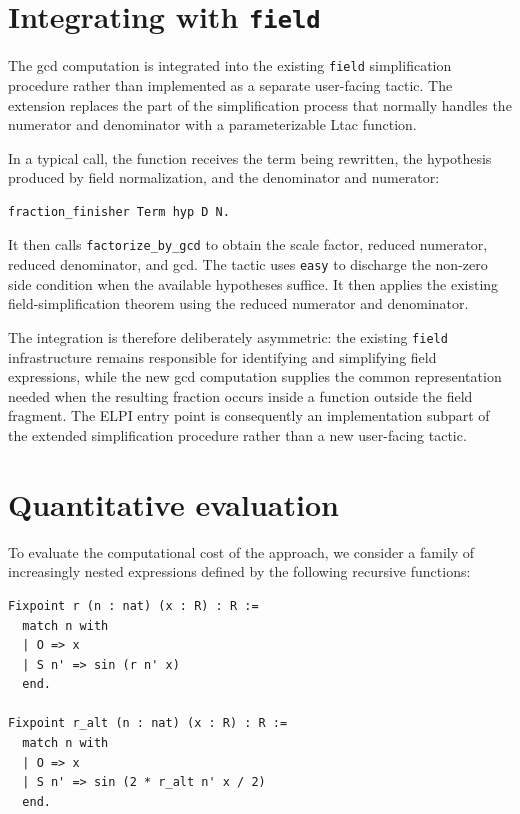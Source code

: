 \documentclass[11pt]{article}
\begin{document}
\section{Integrating with \texttt{field}}


The gcd computation is integrated into the existing \texttt{field}
simplification procedure rather than implemented as a separate user-facing
tactic. The extension replaces the part of the simplification process that
normally handles the numerator and denominator with a parameterizable Ltac
function. 

In a typical call, the function receives the term being rewritten, the
hypothesis produced by field normalization, and the denominator and numerator:
\begin{lstlisting}[language=ML]
fraction_finisher Term hyp D N.
\end{lstlisting}

It then calls \texttt{factorize\_by\_gcd} to obtain the scale factor, reduced
numerator, reduced denominator, and gcd. The tactic uses \texttt{easy} to discharge the non-zero side condition when the available hypotheses suffice. It then applies the existing field-simplification theorem using the reduced numerator and denominator.


The integration is therefore deliberately asymmetric: the existing
\texttt{field} infrastructure remains responsible for identifying and
simplifying field expressions, while the new gcd computation supplies the
common representation needed when the resulting fraction occurs inside a
function outside the field fragment. The ELPI entry point is consequently an
implementation subpart of the extended simplification procedure rather than a
new user-facing tactic.

\section{Quantitative evaluation}

To evaluate the computational cost of the approach, we consider a
family of increasingly nested expressions defined by the following
recursive functions:

\begin{lstlisting}[language=Rocq]
Fixpoint r (n : nat) (x : R) : R :=
  match n with
  | O => x
  | S n' => sin (r n' x)
  end.

Fixpoint r_alt (n : nat) (x : R) : R :=
  match n with
  | O => x
  | S n' => sin (2 * r_alt n' x / 2)
  end.
\end{lstlisting}
\end{document}
